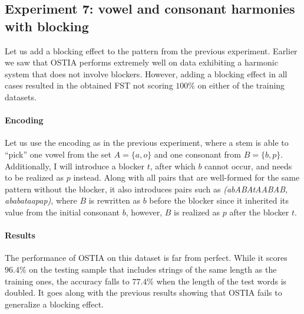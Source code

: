 \subsection{Experiment 7: vowel and consonant harmonies with blocking}

Let us add a blocking effect to the pattern from the previous experiment.
Earlier we saw that OSTIA performs extremely well on data exhibiting a harmonic system that does not involve blockers.
However, adding a blocking effect in all cases resulted in the obtained FST not scoring $100$\% on either of the training datasets.

\paragraph{Encoding}

Let us use the encoding as in the previous experiment, where a stem is able to ``pick'' one vowel from the set $A = \{a, o\}$ and one consonant from $B = \{b, p\}$.
Additionally, I will introduce a blocker $t$, after which $b$ cannot occur, and needs to be realized as $p$ instead.
Along with all pairs that are well-formed for the same pattern without the blocker, it also introduces pairs such as \emph{(abABAtAABAB, ababataapap)}, where $B$ is rewritten as $b$ before the blocker since it inherited its value from the initial consonant $b$, however, $B$ is realized as $p$ after the blocker $t$.


\paragraph{Results}

The performance of OSTIA on this dataset is far from perfect.
While it scores $96.4$\% on the testing sample that includes strings of the same length as the training ones, the accuracy falls to $77.4$\% when the length of the test words is doubled.
It goes along with the previous results showing that OSTIA fails to generalize a blocking effect.




